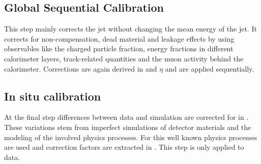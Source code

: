 \subsection{Global Sequential Calibration}

This step mainly corrects the jet \pt without changing the mean energy of the jet. It corrects for non-compensation, dead material and leakage effects by using observables like the charged particle fraction, energy fractions in different calorimeter layers, track-related quantities and the muon activity behind the calorimeter. Corrections are again derived in \pt and $\eta$ and are applied sequentially.

\subsection{In situ calibration}
At the final step differences between data and simulation are corrected for in \pt. These variations stem from imperfect simulations of detector materials and the modeling of the involved physics processes. For this well known physics processes are used and correction factors are extracted in \pt. This step is only applied to data.

